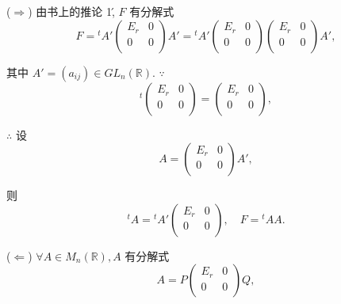 \documentclass[color=black,device=normal,lang=cn,mode=geye]{elegantnote}
\begin{document}
\begin{solution}
    ($\Rightarrow$) 由书上的推论 1\', $F$ 有分解式
    \[F={}^tA'\begin{pmatrix}
        E_r & 0 \\
        0 & 0 \\
    \end{pmatrix}A'={}^tA'\begin{pmatrix}
        E_r & 0 \\
        0 & 0 \\
    \end{pmatrix}\begin{pmatrix}
        E_r & 0 \\
        0 & 0 \\
    \end{pmatrix}A',\]

    其中 $A'=(a_{ij})\in GL_n(\mathbb{R})$. $\because$
    \[{}^t\begin{pmatrix}
        E_r & 0 \\
        0 & 0 \\
    \end{pmatrix}=\begin{pmatrix}
        E_r & 0 \\
        0 & 0 \\
    \end{pmatrix},\]

    $\therefore$ 设
    \[A=\begin{pmatrix}
        E_r & 0 \\
        0 & 0 \\
    \end{pmatrix}A',\]

    则
    \[{}^tA={}^tA'\begin{pmatrix}
        E_r & 0 \\
        0 & 0 \\
    \end{pmatrix},\quad F={}^tAA.\]

    ($\Leftarrow$) $\forall A\in M_n(\mathbb{R}),A$ 有分解式
    \[A=P\begin{pmatrix}
        E_r & 0 \\
        0 & 0 \\
    \end{pmatrix}Q,\]


\end{solution}
\end{document}
